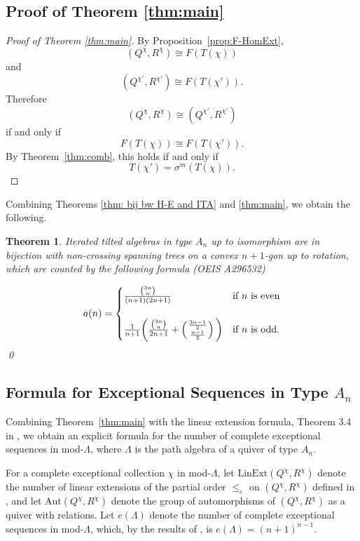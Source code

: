 \documentclass[12pt]{amsart}
\newtheorem{thm}{Theorem}[section]
\theoremstyle{definition}
\theoremstyle{remark}
\numberwithin{equation}{section}
\begin{document}
\subsection{Proof of Theorem \ref{thm:main}}

\begin{proof}[Proof of Theorem \ref{thm:main}]
By Proposition~\ref{prop:F-HomExt},
\[
(Q^\chi,R^\chi) \cong F(T(\chi))
\]
and
\[
(Q^{\chi'},R^{\chi'}) \cong F(T(\chi')).
\]
Therefore
\[
(Q^\chi,R^\chi) \cong (Q^{\chi'},R^{\chi'})
\]
if and only if
\[
F(T(\chi))\cong F(T(\chi')).
\]
By Theorem~\ref{thm:comb}, this holds if and only if
\[
T(\chi')=\sigma^m(T(\chi)).
\]
\end{proof}

Combining Theorems \ref{thm: bij bw H-E and ITA} and \ref{thm:main}, we obtain the following. 

\begin{thm}\label{thm: bij bw ITA and trees up to rotation}
    Iterated tilted algebras in type $A_n$ up to isomorphism are in bijection with non-crossing spanning trees on a convex $n+1$-gon up to rotation, which are counted by the following formula (OEIS A296532) 

    \[a(n)=
    \begin{cases}
        \frac{\binom{3n}{n}}{(n+1)(2n+1)} & \text{if } n \text{ is even}\\ 
         & \\
        \frac{1}{n+1}\bigg(\frac{\binom{3n}{n}}{2n+1} + \left( {{3n-1\over 2} \atop {n-1\over 2}} \right) \bigg)& \text{if } n \text{ is odd.}
    \end{cases}\]
   \qed
\end{thm}


\subsection{Formula for Exceptional Sequences in Type \(A_n\)}\label{subsec: counting E.S. in type A}

Combining Theorem~\ref{thm:main} with the linear extension formula, Theorem 3.4 in \cite{igusa2025hom}, we obtain an explicit formula for the number of complete exceptional sequences in mod-$\Lambda$, where $\Lambda$ is the path algebra of a quiver of type $A_n$.

For a complete exceptional collection $\chi$ in mod-$\Lambda$, let $\mathrm{LinExt}(Q^\chi, R^\chi)$ denote the number of linear extensions of the partial order $\leq_e$ on $(Q^\chi, R^\chi)$ defined in \cite[Definition 3.4]{igusa2025hom}, and let $\mathrm{Aut}(Q^\chi, R^\chi)$ denote the group of automorphisms of $(Q^\chi, R^\chi)$ as a quiver with relations. Let $e(\Lambda)$ denote the number of complete exceptional sequences in mod-$\Lambda$, which, by the results of \cite{obaid2013number}, is $e(\Lambda)=(n+1)^{n-1}$.
\end{document}
